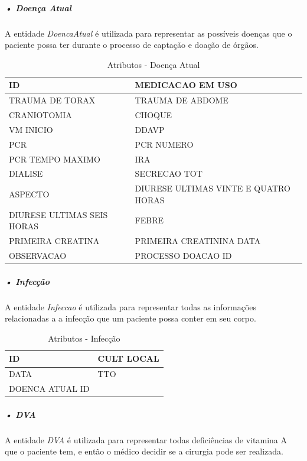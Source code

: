 \documentclass[portuguese,oneside]{tcc}
\begin{document}
\subparagraph{• Doença Atual}
A entidade \textit{DoencaAtual} é utilizada para representar as possíveis doenças que o paciente possa ter durante o processo de captação e doação de órgãos.

\begin{table}
\centering
\caption{Atributos - Doença Atual} \label{table:atr-doenca-atual}
\begin{tabular}{ |p{6cm}|p{6cm}| }

\hline
ID & MEDICACAO EM USO\\
\hline
TRAUMA DE TORAX & TRAUMA DE ABDOME\\
\hline
CRANIOTOMIA & CHOQUE\\
\hline
VM INICIO & DDAVP\\

\hline
PCR & PCR NUMERO\\
\hline
PCR TEMPO MAXIMO & IRA\\

\hline
DIALISE & SECRECAO TOT\\
\hline
ASPECTO & DIURESE ULTIMAS VINTE E QUATRO HORAS\\

\hline
DIURESE ULTIMAS SEIS HORAS & FEBRE\\
\hline
PRIMEIRA CREATINA & PRIMEIRA CREATININA DATA\\
\hline
OBSERVACAO & PROCESSO DOACAO ID\\

\hline

\end{tabular}
\end{table}

\subparagraph{• Infecção}
A entidade \textit{Infeccao} é utilizada para representar todas as informações relacionadas a a infecção que um paciente possa conter em seu corpo.

\begin{table}
\centering
\caption{Atributos - Infecção} \label{table:atr-infeccao}
\begin{tabular}{ |p{6cm}|p{6cm}| }

\hline
ID & CULT LOCAL\\
\hline
DATA & TTO\\
\hline
DOENCA ATUAL ID & \\
\hline

\end{tabular}
\end{table}


\subparagraph{• DVA}
A entidade \textit{DVA} é utilizada para representar todas deficiências de vitamina A que o paciente tem, e então o médico decidir se a cirurgia pode ser realizada.
\end{document}
